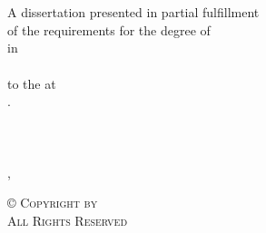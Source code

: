 \begin{center}
\vspace{60pt}
\Huge \kern 2mm \textbf{\projecttitle{}} \\ 
\vspace{60pt}
{\LARGE \textit{\projectauthor{}}} \\
\vspace{160pt}
\doublespaced
\large
A dissertation presented in partial fulfillment \\
of the requirements for the degree of \\
\textbf{\degreelong{}} in \\
\textbf{\track{}} \\
to the \textbf{\school{}} at \\
\textbf{\institution{}}. \\
\vspace{90pt}
\department{} \\
\school{} \\
\institution{} \\
\vspace{30pt}
\normalsize
\completionmonth{}, \completionyear{}\\
\end{center}
\vspace*{\fill}
\clearpage

\vspace*{\fill}
\begin{center}
\doublespaced
\scshape \copyright \hspace{3pt} Copyright \completionyear{} by \projectauthor{}\\
All Rights Reserved
\end{center}
\vspace*{\fill}
\clearpage

